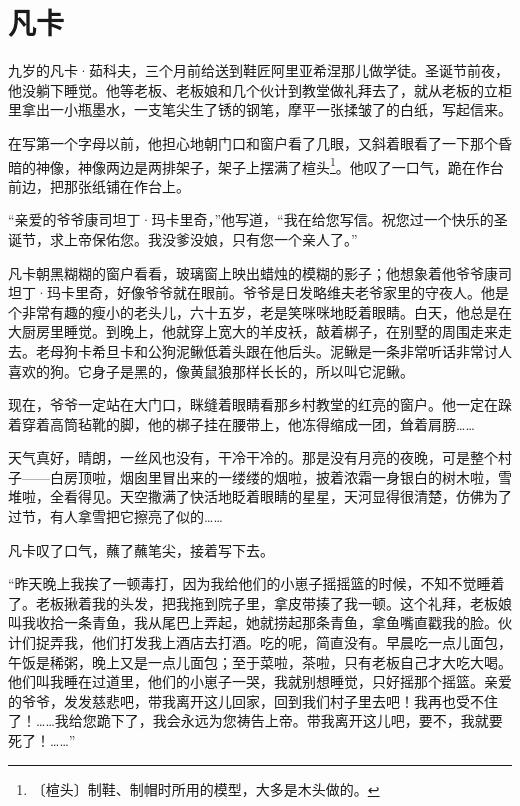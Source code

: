 \documentclass[12pt,UTF-8,openany]{ctexbook}
\begin{document}
\chapter{凡卡}

\begin{large}
    
    九岁的凡卡·茹科夫，三个月前给送到鞋匠阿里亚希涅那儿做学徒。圣诞节前夜，他没躺下睡觉。他等老板、老板娘和几个伙计到教堂做礼拜去了，就从老板的立柜里拿出一小瓶墨水，一支笔尖生了锈的钢笔，摩平一张揉皱了的白纸，写起信来。
    
    在写第一个字母以前，他担心地朝门口和窗户看了几眼，又斜着眼看了一下那个昏暗的神像，神像两边是两排架子，架子上摆满了楦头\footnote{〔楦头〕制鞋、制帽时所用的模型，大多是木头做的。}。他叹了一口气，跪在作台前边，把那张纸铺在作台上。
    
    “亲爱的爷爷康司坦丁·玛卡里奇，”他写道，“我在给您写信。祝您过一个快乐的圣诞节，求上帝保佑您。我没爹没娘，只有您一个亲人了。”
    
    凡卡朝黑糊糊的窗户看看，玻璃窗上映出蜡烛的模糊的影子；他想象着他爷爷康司坦丁·玛卡里奇，好像爷爷就在眼前。爷爷是日发略维夫老爷家里的守夜人。他是个非常有趣的瘦小的老头儿，六十五岁，老是笑咪咪地眨着眼睛。白天，他总是在大厨房里睡觉。到晚上，他就穿上宽大的羊皮袄，敲着梆子，在别墅的周围走来走去。老母狗卡希旦卡和公狗泥鳅低着头跟在他后头。泥鳅是一条非常听话非常讨人喜欢的狗。它身子是黑的，像黄鼠狼那样长长的，所以叫它泥鳅。
    
    现在，爷爷一定站在大门口，眯缝着眼睛看那乡村教堂的红亮的窗户。他一定在跺着穿着高筒毡靴的脚，他的梆子挂在腰带上，他冻得缩成一团，耸着肩膀……
    
    天气真好，晴朗，一丝风也没有，干冷干冷的。那是没有月亮的夜晚，可是整个村子——白房顶啦，烟囱里冒出来的一缕缕的烟啦，披着浓霜一身银白的树木啦，雪堆啦，全看得见。天空撒满了快活地眨着眼睛的星星，天河显得很清楚，仿佛为了过节，有人拿雪把它擦亮了似的……
    
    凡卡叹了口气，蘸了蘸笔尖，接着写下去。
    
    “昨天晚上我挨了一顿毒打，因为我给他们的小崽子摇摇篮的时候，不知不觉睡着了。老板揪着我的头发，把我拖到院子里，拿皮带揍了我一顿。这个礼拜，老板娘叫我收拾一条青鱼，我从尾巴上弄起，她就捞起那条青鱼，拿鱼嘴直戳我的脸。伙计们捉弄我，他们打发我上酒店去打酒。吃的呢，简直没有。早晨吃一点儿面包，午饭是稀粥，晚上又是一点儿面包；至于菜啦，茶啦，只有老板自己才大吃大喝。他们叫我睡在过道里，他们的小崽子一哭，我就别想睡觉，只好摇那个摇篮。亲爱的爷爷，发发慈悲吧，带我离开这儿回家，回到我们村子里去吧！我再也受不住了！……我给您跪下了，我会永远为您祷告上帝。带我离开这儿吧，要不，我就要死了！……”
    

\end{large}
\end{document}
